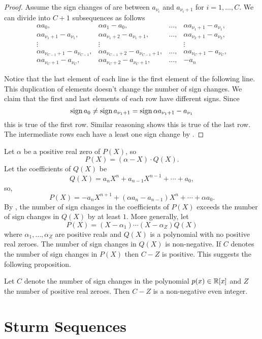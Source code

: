 \begin{proof}
Assume the sign changes of  are between
$a_{\nu_i}$ and $a_{\nu_i+1}$ for $i = 1, \ldots, C$.  We can divide
 into $C+1$ subsequences as follows
\begin{equation}\label{PRS:SignSubSeq:Eq}
\begin{array}{ccccc}
\alpha a_0, & \alpha a_1 - a_0,& \ldots, &
 \alpha a_{\nu_1+1} - a_{\nu_1}, \\
\alpha a_{\nu_1+1} - a_{\nu_1}, &
  \alpha a_{\nu_1+2} - a_{\nu_1+1},& \ldots, &\alpha a_{\nu_2+1} - a_{\nu_2},\\
\vdots &\vdots & & \vdots \\
\alpha a_{\nu_{C-1}+1} - a_{\nu_{C-1}}, &
  \alpha a_{\nu_{C-1}+2} - a_{\nu_{C-1}+1}, &\ldots, 
   &\alpha a_{\nu_C+1} - a_{\nu_C}, \\
\alpha a_{\nu_C+1} - a_{\nu_C},& \alpha a_{\nu_C+2} - a_{\nu_C+1}, 
   &\ldots, &- a_n
\end{array}
\end{equation}

Notice that the last element of each line is the first element of the
following line.  This duplication of elements doesn't change the
number of sign changes.  We claim that the first and last elements of
each row have different signs.  Since 
\[
\mathop{\rm sign}\nolimits a_0 \not= \mathop{\rm sign}\nolimits a_{\nu_1+1} = \mathop{\rm sign}\nolimits \alpha a_{\nu_1+1} -
a_{\nu_1}
\]
this is true of the first row.  Similar reasoning shows this is true
of the last row.  The intermediate rows each have a least one sign
change by .
\end{proof}

Let $\alpha$ be a positive real zero of $P(X)$, so 
\[
P(X) = (\alpha - X) \cdot Q(X).
\]
Let the coefficients of $Q(X)$ be 
\[
Q(X) = a_n X^n + a_{n-1} X^{n-1} + \cdots + a_0,
\]
so,
\[
P(X) = - a_n X^{n+1} + (\alpha a_n - a_{n-1}) X^n + \cdots + \alpha
a_0.
\]
By , the number of sign changes in the
coefficients of $P(X)$ exceeds the number of sign changes in $Q(X)$ by
at least $1$.  More generally, let
\[
P(X) = (X - \alpha_1) \cdots (X - \alpha_Z) Q(X)
\]
where $\alpha_1, \ldots, \alpha_Z$ are positive reals and $Q(X)$ is a
polynomial with no positive real zeroes.  The number of sign changes
in $Q(X)$ is non-negative.  If $C$ denotes the number of sign changes
in $P(X)$ then $C - Z$ is positive.  This suggests the following proposition.

\begin{proposition}[Descartes]
\label{Descartes:Sign:Prop}
Let $C$ denote the number of sign changes in the polynomial $p(x) \in
\mathbb{R}[x]$ and $Z$ the number of positive real zeroes.  Then $C - Z$ is a
non-negative even integer.
\end{proposition} 

\section{Sturm Sequences}
\label{Sturm:Seq:Sec}

